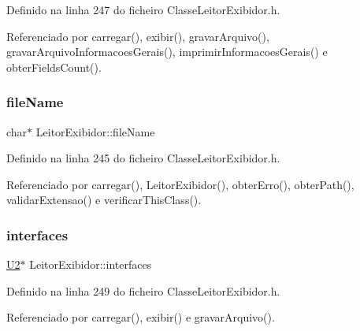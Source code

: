 Definido na linha 247 do ficheiro Classe\+Leitor\+Exibidor.\+h.



Referenciado por carregar(), exibir(), gravar\+Arquivo(), gravar\+Arquivo\+Informacoes\+Gerais(), imprimir\+Informacoes\+Gerais() e obter\+Fields\+Count().

\mbox{\label{classLeitorExibidor_a1dfa84388856ad4d83883e4e5548b485}} 
\subsubsection{\texorpdfstring{file\+Name}{fileName}}
{\footnotesize\ttfamily char$\ast$ Leitor\+Exibidor\+::file\+Name\hspace{0.3cm}{\ttfamily [private]}}



Definido na linha 245 do ficheiro Classe\+Leitor\+Exibidor.\+h.



Referenciado por carregar(), Leitor\+Exibidor(), obter\+Erro(), obter\+Path(), validar\+Extensao() e verificar\+This\+Class().

\mbox{\label{classLeitorExibidor_a7c19cc595c9d806b30477b5b008f3caa}} 
\subsubsection{\texorpdfstring{interfaces}{interfaces}}
{\footnotesize\ttfamily \hyperlink{BasicTypes_8h_a90240657108b1b457eef9d3f76e0202e}{U2}$\ast$ Leitor\+Exibidor\+::interfaces\hspace{0.3cm}{\ttfamily [private]}}



Definido na linha 249 do ficheiro Classe\+Leitor\+Exibidor.\+h.



Referenciado por carregar(), exibir() e gravar\+Arquivo().

\mbox{\label{classLeitorExibidor_a596a1440982d2418e39adf5b1857ab15}} 
